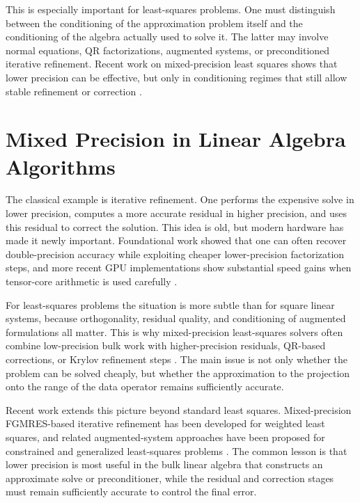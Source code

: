This is especially important for least-squares problems. One must distinguish
between the conditioning of the approximation problem itself and the conditioning
of the algebra actually used to solve it. The latter may involve normal equations,
QR factorizations, augmented systems, or preconditioned iterative refinement.
Recent work on mixed-precision least squares shows that lower precision can be
effective, but only in conditioning regimes that still allow stable refinement or
correction \cite{higham2021lowerprecision,carson2020threeprecision,gao2025mixedprecision,oktay2024mixedprecision}.

\section{Mixed Precision in Linear Algebra Algorithms}

The classical example is iterative refinement. One performs the expensive solve in
lower precision, computes a more accurate residual in higher precision, and uses
this residual to correct the solution. This idea is old, but modern hardware has
made it newly important. Foundational work showed that one can often recover
double-precision accuracy while exploiting cheaper lower-precision factorization
steps, and more recent GPU implementations show substantial speed gains when
tensor-core arithmetic is used carefully \cite{langou2006exploiting,haidar2020tensorcores,higham2022mixed}.

For least-squares problems the situation is more subtle than for square linear
systems, because orthogonality, residual quality, and conditioning of augmented
formulations all matter. This is why mixed-precision least-squares solvers often
combine low-precision bulk work with higher-precision residuals, QR-based
corrections, or Krylov refinement steps \cite{higham2021lowerprecision,carson2020threeprecision}. The main issue is not only whether the problem can be solved
cheaply, but whether the approximation to the projection onto the range of the
data operator remains sufficiently accurate.

Recent work extends this picture beyond standard least squares. Mixed-precision
FGMRES-based iterative refinement has been developed for weighted least squares,
and related augmented-system approaches have been proposed for constrained and
generalized least-squares problems \cite{carson2024wlsir,gao2025mixedprecision}.
The common lesson is that lower precision is most useful in the bulk linear
algebra that constructs an approximate solve or preconditioner, while the residual
and correction stages must remain sufficiently accurate to control the final error.

